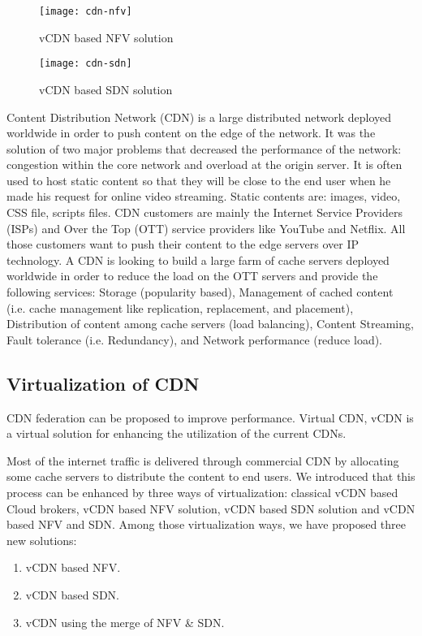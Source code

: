 \documentclass[letterpaper,conference]{IEEEtran}
\begin{document}
\begin{figure}[t]
\centering
\texttt{[image: cdn-nfv]}
\caption{vCDN based NFV solution}
\label{7}
\end{figure}

\begin{figure}[t]
\centering
\texttt{[image: cdn-sdn]}
\caption{vCDN based SDN solution}
\label{8}
\end{figure}

Content Distribution Network (CDN) is a large distributed network deployed worldwide in order to push content on the edge of the network. It was the solution of two major problems that decreased the performance of the network: congestion within the core network and overload at the origin server. It is often used to host static content so that they will be close to the end user when he made his request for online video streaming. Static contents are: images, video, CSS file, scripts files. CDN customers are mainly the Internet Service Providers (ISPs) and Over the Top (OTT) service providers like YouTube and Netflix. All those customers want to push their content to the edge servers over IP technology. A CDN is looking to build a large farm of cache servers deployed worldwide in order to reduce the load on the OTT servers and
provide the following services: Storage (popularity based), Management of cached content (i.e. cache management like replication, replacement, and placement), Distribution of content among cache servers (load balancing), Content Streaming, Fault tolerance (i.e. Redundancy), and Network performance (reduce load).

\subsection{Virtualization of CDN}

CDN federation can be proposed to improve performance. Virtual CDN, vCDN is a virtual solution for enhancing the utilization of the current CDNs.

Most of the internet traffic is delivered through
commercial CDN by allocating some cache servers to
distribute the content to end users. We introduced that this process can be enhanced by three ways of virtualization: classical vCDN based Cloud brokers, vCDN based NFV solution, vCDN based SDN solution and vCDN based NFV and SDN. Among those virtualization ways, we have proposed three new solutions:
\begin{enumerate}
\item vCDN based NFV.
\item vCDN based SDN.
\item vCDN using the merge of NFV \& SDN.
\end{enumerate}
\end{document}
